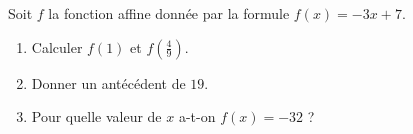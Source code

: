 
\begin{exercice}\label{exosmath-0510}

    Soit \( f\) la fonction affine donnée par la formule \( f(x)=-3x+7\).
    \begin{enumerate}
        \item
            Calculer \( f(1)\) et \( f(\frac{ 4 }{ 9 })\).
        \item
            Donner un antécédent de \( 19\).
        \item
            Pour quelle valeur de \( x\) a-t-on \( f(x)=-32\) ?
    \end{enumerate}

\end{exercice}
